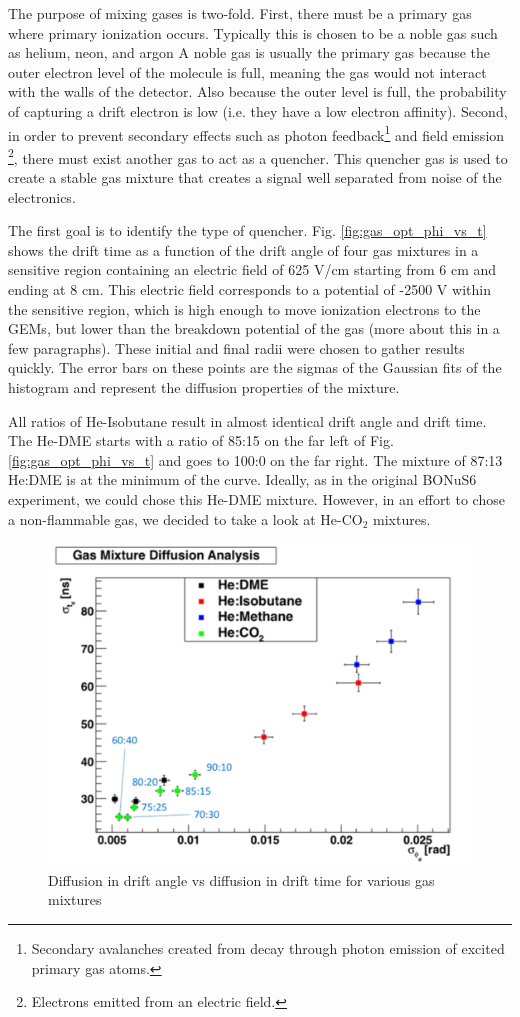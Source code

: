 The purpose of mixing gases is two-fold. First, there must be a primary gas where primary ionization occurs. Typically this is chosen to be a noble gas such as helium, neon, and argon A noble gas is usually the primary gas because the outer electron level of the molecule is full, meaning the gas would not interact with the walls of the detector. Also because the outer level is full, the probability of capturing a drift electron is low (i.e. they have a low electron affinity). Second, in order to prevent secondary effects such as photon feedback\footnote{Secondary avalanches created from decay through photon emission of excited primary gas atoms.} and field emission \footnote{Electrons emitted from an electric field.}, there must exist another gas to act as a quencher. This quencher gas is used to create a stable gas mixture that creates a signal well separated from noise of the electronics.

The first goal is to identify the type of quencher. Fig. \ref{fig:gas_opt_phi_vs_t} shows the drift time as a function of the drift angle of four gas mixtures in a sensitive region containing an electric field of 625 V/cm starting from 6 cm and ending at 8 cm. This electric field corresponds to a potential of -2500 V within the sensitive region, which is high enough to move ionization electrons to the GEMs, but lower than the breakdown potential of the gas (more about this in a few paragraphs). These initial and final radii were chosen to gather results quickly. The error bars on these points are the sigmas of the Gaussian fits of the histogram and represent the diffusion properties of the mixture.

All ratios of He-Isobutane result in almost identical drift angle and drift time. The He-DME starts with a ratio of 85:15 on the far left of Fig. \ref{fig:gas_opt_phi_vs_t} and goes to 100:0 on the far right. The mixture of 87:13 He:DME is at the minimum of the curve. Ideally, as in the original BONuS6 experiment, we could chose this He-DME mixture. However, in an effort to chose a non-flammable gas, we decided to take a look at He-CO$_2$ mixtures.

\begin{figure}[h!]
	\centering
	\includegraphics[width=0.8\linewidth]{figures/gas_opt_sigphi_vs_sigt.png}
	\caption{Diffusion in drift angle vs diffusion in drift time for various gas mixtures}
	\label{fig:gas_opt_sigphi_vs_sigt}
\end{figure}

